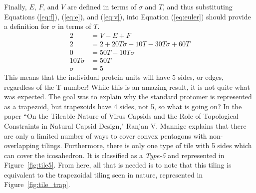 \documentclass[12pt,letter]{article}
\begin{document}
Finally, $E$, $F$, and $V$ are defined in terms of $\sigma$ and $T$, and thus substituting Equations (\ref{eq:f}), (\ref{eq:e}), and (\ref{eq:v}), into Equation (\ref{eq:euler}) should provide a definition for $\sigma$ in terms of $T$.
\begin{align*}
	2 & = V - E + F\\
	2 &= 2 + 20T\sigma - 10T - 30 T \sigma + 60 T \\
	0 &= 50T - 10T\sigma \\
	10T\sigma &= 50T \\
	\sigma &= 5
\end{align*}
%
This means that the individual protein units will have 5 sides, or edges, regardless of the T-number! While this is an amazing result, it is not quite what was expected. The goal was to explain why the standard protomer is represented as a trapezoid, but trapezoids have 4 sides, not 5, so what is going on? In the paper ``On the Tileable Nature of Virus Capsids and the Role of Topological Constraints in Natural Capsid Design," Ranjan V. Mannige explains that there are only a limited number of ways to cover convex pentagons with non-overlapping tilings. Furthermore, there is only one type of tile with 5 sides which can cover the icosahedron. It is classified as a \textit{Type-5} and represented in Figure~\ref{fig:tile5}. From here, all that is needed is to note that this tiling is equivalent to the trapezoidal tiling seen in nature, represented in Figure~\ref{fig:tile_trap}. 
\end{document}
